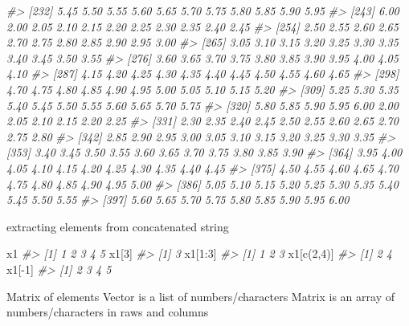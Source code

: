 \documentclass[
]{article}
\newenvironment{Shaded}{\begin{snugshade}}{\end{snugshade}}
\newcommand{\CommentTok}[1]{\textcolor[rgb]{0.56,0.35,0.01}{\textit{#1}}}
\newcommand{\DecValTok}[1]{\textcolor[rgb]{0.00,0.00,0.81}{#1}}
\newcommand{\FunctionTok}[1]{\textcolor[rgb]{0.00,0.00,0.00}{#1}}
\newcommand{\NormalTok}[1]{#1}
\newcommand{\SpecialCharTok}[1]{\textcolor[rgb]{0.00,0.00,0.00}{#1}}
\begin{document}
\begin{Shaded}
\begin{Highlighting}[]
\CommentTok{\#\textgreater{} [232] 5.45 5.50 5.55 5.60 5.65 5.70 5.75 5.80 5.85 5.90 5.95}
\CommentTok{\#\textgreater{} [243] 6.00 2.00 2.05 2.10 2.15 2.20 2.25 2.30 2.35 2.40 2.45}
\CommentTok{\#\textgreater{} [254] 2.50 2.55 2.60 2.65 2.70 2.75 2.80 2.85 2.90 2.95 3.00}
\CommentTok{\#\textgreater{} [265] 3.05 3.10 3.15 3.20 3.25 3.30 3.35 3.40 3.45 3.50 3.55}
\CommentTok{\#\textgreater{} [276] 3.60 3.65 3.70 3.75 3.80 3.85 3.90 3.95 4.00 4.05 4.10}
\CommentTok{\#\textgreater{} [287] 4.15 4.20 4.25 4.30 4.35 4.40 4.45 4.50 4.55 4.60 4.65}
\CommentTok{\#\textgreater{} [298] 4.70 4.75 4.80 4.85 4.90 4.95 5.00 5.05 5.10 5.15 5.20}
\CommentTok{\#\textgreater{} [309] 5.25 5.30 5.35 5.40 5.45 5.50 5.55 5.60 5.65 5.70 5.75}
\CommentTok{\#\textgreater{} [320] 5.80 5.85 5.90 5.95 6.00 2.00 2.05 2.10 2.15 2.20 2.25}
\CommentTok{\#\textgreater{} [331] 2.30 2.35 2.40 2.45 2.50 2.55 2.60 2.65 2.70 2.75 2.80}
\CommentTok{\#\textgreater{} [342] 2.85 2.90 2.95 3.00 3.05 3.10 3.15 3.20 3.25 3.30 3.35}
\CommentTok{\#\textgreater{} [353] 3.40 3.45 3.50 3.55 3.60 3.65 3.70 3.75 3.80 3.85 3.90}
\CommentTok{\#\textgreater{} [364] 3.95 4.00 4.05 4.10 4.15 4.20 4.25 4.30 4.35 4.40 4.45}
\CommentTok{\#\textgreater{} [375] 4.50 4.55 4.60 4.65 4.70 4.75 4.80 4.85 4.90 4.95 5.00}
\CommentTok{\#\textgreater{} [386] 5.05 5.10 5.15 5.20 5.25 5.30 5.35 5.40 5.45 5.50 5.55}
\CommentTok{\#\textgreater{} [397] 5.60 5.65 5.70 5.75 5.80 5.85 5.90 5.95 6.00}
\end{Highlighting}
\end{Shaded}

extracting elements from concatenated string

\begin{Shaded}
\begin{Highlighting}[]
\NormalTok{x1}
\CommentTok{\#\textgreater{} [1] 1 2 3 4 5}
\NormalTok{x1[}\DecValTok{3}\NormalTok{]}
\CommentTok{\#\textgreater{} [1] 3}
\NormalTok{x1[}\DecValTok{1}\SpecialCharTok{:}\DecValTok{3}\NormalTok{]}
\CommentTok{\#\textgreater{} [1] 1 2 3}
\NormalTok{x1[}\FunctionTok{c}\NormalTok{(}\DecValTok{2}\NormalTok{,}\DecValTok{4}\NormalTok{)]}
\CommentTok{\#\textgreater{} [1] 2 4}
\NormalTok{x1[}\SpecialCharTok{{-}}\DecValTok{1}\NormalTok{]}
\CommentTok{\#\textgreater{} [1] 2 3 4 5}
\end{Highlighting}
\end{Shaded}

Matrix of elements
Vector is a list of numbers/characters
Matrix is an array of numbers/characters in raws and columns
\end{document}
